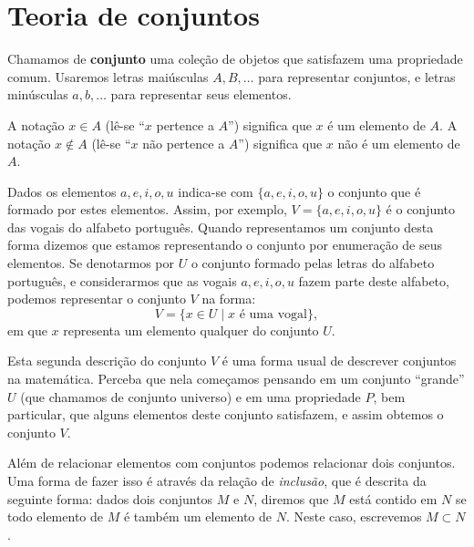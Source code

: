 
\chapter{Teoria de conjuntos}


Chamamos de \textbf{conjunto} uma coleção de objetos que satisfazem uma propriedade comum. Usaremos letras maiúsculas $A, B, \ldots$ para representar  conjuntos, e letras minúsculas $a, b, \ldots$ para representar seus elementos.

A notação $x \in A$ (lê-se ``$x$ pertence a $A$'') significa que $x$ é um elemento de $A$. A notação $x \notin A$ (lê-se ``$x$ não pertence a $A$'') significa que $x$ não é um elemento de $A$.

Dados os elementos $a, e, i, o, u$ indica-se com $\{a, e, i, o, u\}$ o conjunto que é formado por estes elementos. Assim, por exemplo, $V= \{a, e, i, o, u\}$ é o conjunto das vogais do alfabeto português. Quando representamos um conjunto desta forma dizemos que estamos representando o conjunto por enumeração de seus elementos. Se denotarmos por $U$ o conjunto formado pelas letras do alfabeto português, e considerarmos que as vogais $a, e, i, o, u$ fazem parte deste alfabeto, podemos representar o conjunto $V$ na forma:
\begin{equation}
V= \{x \in U \mid x \text{ é uma vogal}\},
\end{equation}
em que $x$ representa um elemento qualquer do conjunto $U$.

Esta segunda descrição do conjunto $V$ é uma forma usual de descrever conjuntos na matemática. Perceba que nela começamos pensando em um conjunto ``grande'' $U$ (que chamamos de conjunto universo) e em uma propriedade $P$, bem particular, que alguns elementos deste conjunto satisfazem, e assim obtemos o conjunto $V$.

Além de relacionar elementos com conjuntos podemos relacionar dois conjuntos. Uma forma de fazer isso é através da relação de \textit{inclusão}, que é descrita da seguinte forma: dados dois conjuntos $M$ e $N$, diremos que $M$ está contido em $N$ se todo elemento de $M$ é também um elemento de $N$. Neste caso, escrevemos $M \subset N$.

